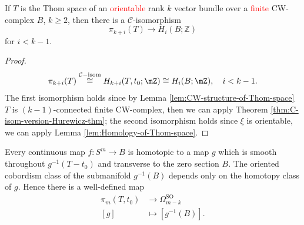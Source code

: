 \begin{corollary}
    If $T$ is the Thom space of an \textcolor{red}{orientable} rank $k$ vector bundle over a
    \textcolor{red}{finite} CW-complex $B$, $k\geq2$, then there is a $\mathcal{C}$-isomorphism
    \begin{equation*}
        \pi_{k+i}(T) \to H_i(B;\mathbb{Z})
    \end{equation*}
    for $i<k-1$.
\end{corollary}
\begin{proof}
    \begin{equation*}
        \pi_{k+i}(T) \overset{\mathcal{C}-\text{isom}}{\cong} H_{k+i}(T,t_0;\mZ) \cong H_i(B;\mZ), \quad i<k-1.
    \end{equation*}
    The first isomorphism holds since by Lemma \ref{lem:CW-structure-of-Thom-space} 
    $T$ is $(k-1)$-connected finite CW-complex, then we can apply Theorem \ref{thm:C-isom-version-Hurewicz-thm};
    the second isomorphism holds since $\xi$ is orientable, we can apply Lemma \ref{lem:Homology-of-Thom-space}.
\end{proof}

\begin{theorem}
    Every continuous map $f\colon S^{m} \to B$ is homotopic to a map 
    $g$ which is smooth throughout $g^{-1}(T-t_0)$ and transverse to the zero section $B$.
    The oriented cobordism class of the submanifold $g^{-1}(B)$ depends only on the homotopy 
    class of $g$. Hence there is a well-defined map
    \begin{align*}
        \pi_{m}(T,t_0) &\to \Omega^{\mathrm{SO}}_{m-k} \\
        [g] &\mapsto [g^{-1}(B)].
    \end{align*}
\end{theorem}

